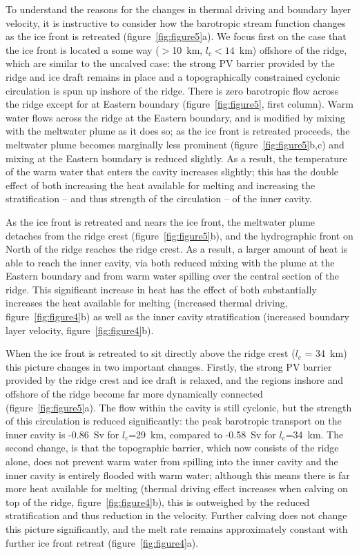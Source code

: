 \documentclass[draft]{agujournal2019}
\begin{document}
To understand the reasons for the changes in thermal driving and boundary layer velocity, it is instructive to consider how the barotropic stream function changes as the ice front is retreated (figure~\ref{fig:figure5}a). We focus first on the case that the ice front is located a some way ($>$10~km, $l_c<14$~km) offshore of the ridge, which are similar to the uncalved case: the strong PV barrier provided by the ridge and ice draft remains in place and a topographically constrained cyclonic circulation is spun up inshore of the ridge. There is zero barotropic flow across the ridge except for at Eastern boundary (figure~\ref{fig:figure5}, first column). Warm water flows across the ridge at the Eastern boundary, and is modified by mixing with the meltwater plume as it does so; as the ice front is retreated proceeds, the meltwater plume becomes marginally less prominent (figure~\ref{fig:figure5}b,c) and mixing at the Eastern boundary is reduced slightly. As a result, the temperature of the warm water that enters the cavity increases slightly; this has the double effect of both increasing the heat available for melting and increasing the stratification -- and thus strength of the circulation -- of the inner cavity.

As the ice front is retreated and nears the ice front, the meltwater plume detaches from the ridge crest (figure~\ref{fig:figure5}b), and  the hydrographic front on North of the ridge reaches the ridge crest. As a result, a larger amount of heat is able to reach the inner cavity, via both reduced mixing with the plume at the Eastern boundary and from warm water spilling over the central section of the ridge. This significant increase in heat has the effect of both substantially increases the heat available for melting (increased thermal driving, figure~\ref{fig:figure4}b) as well as the inner cavity stratification (increased boundary layer velocity, figure~\ref{fig:figure4}b).

When the ice front is retreated to sit directly above the ridge crest ($l_c$ = 34~km) this picture changes in two important changes. Firstly, the strong PV barrier provided by the ridge crest and ice draft is relaxed, and the regions inshore and offshore of the ridge become far more dynamically connected (figure~\ref{fig:figure5}a). The flow within the cavity is still cyclonic, but the strength of this circulation is reduced significantly: the peak barotropic transport on the inner cavity is -0.86~Sv for $l_c$=29~km, compared to -0.58~Sv for $l_c$=34~km. The second change, is that the topographic barrier, which now consists of the ridge alone, does not prevent warm water from spilling into the inner cavity and the inner cavity is entirely flooded with warm water; although this means there is far more heat available for melting (thermal driving effect increases when calving on top of the ridge, figure~\ref{fig:figure4}b), this is outweighed by the reduced stratification and thus reduction in the velocity. Further calving does not change this picture significantly, and the melt rate remains approximately constant with further ice front retreat (figure~\ref{fig:figure4}a).
\end{document}
